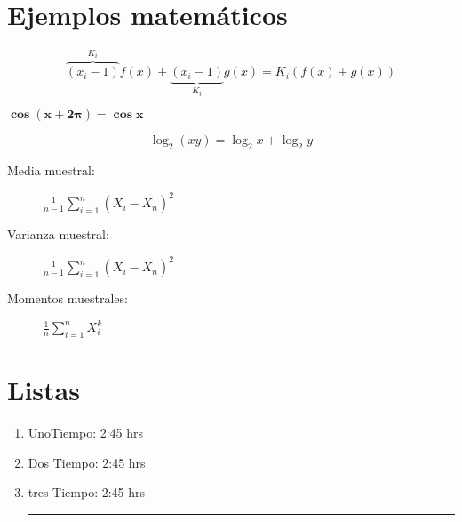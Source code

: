 \documentclass{article}
\begin{document}
\section{Ejemplos matemáticos}

\begin{center}
{\fboxsep 12pt
}
\end{center}

\[ \overbrace{(x_i-1)}^{K_i}f(x)+\underbrace{(x_i-1)}_{K_i}g(x)
= K_i(f(x)+g(x)) \]

$\pmb{\cos(x+2\pi)=\cos x}$

\begin{equation}
\log_{2}(xy)=\log_2x + \log_2y
\end{equation}

\begin{description}
	\item[Media muestral:] $\frac{1}{n-1}\sum_{i=1}^n (X_i-\bar{X_n})^2$
	\item[Varianza muestral:] $\frac{1}{n-1} \sum_{i=1}^n (X_i-\bar{X_n})^2$
	\item[Momentos muestrales:] $\frac{1}{n} \sum_{i=1}^n X_i^k$
\end{description}

\section{Listas}

\begin{enumerate}[label=\emph{\alph*})]
	\item Uno\hrulefill Tiempo: 2:45 hrs
	\item Dos \dotfill Tiempo: 2:45 hrs
	\item tres \hfill Tiempo: 2:45 hrs
	\rule[0.5cm]{11cm}{0.01cm}%
\end{enumerate}
\end{document}
